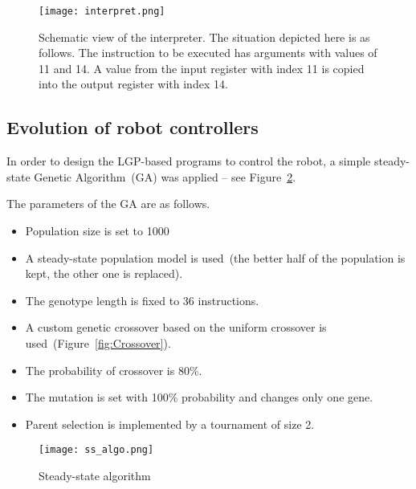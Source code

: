 \documentclass{ExcelAtFIT}
\begin{document}
\begin{figure}[h]
	\centering
	{\texttt{[image: interpret.png]}}
	\caption{
	Schematic view of the interpreter.
	The situation depicted here is as follows.
	The instruction to be executed has arguments with values of 11 and 14.
	A value from the input register with index 11 is copied into the output register with index 14.
	}
	\label{fig:Interpret}
\end{figure}



\subsection{Evolution of robot controllers}
\label{sec:EvolutionOfRobotControllers}
In order to design the LGP-based programs to control the robot, a simple steady-state Genetic Algorithm~(GA) was applied -- see Figure~\ref{fig:SteadyStateAlgorithm}.

The parameters of the GA are as follows.
\begin{itemize}
	\item Population size is set to 1000
	\item A steady-state population model is used~(the better half of the population is kept, the other one is replaced).
	\item The genotype length is fixed to 36 instructions.
	\item A custom genetic crossover based on the uniform crossover is used~(Figure~\ref{fig:Crossover}).
	\item The probability of crossover is 80\%.
	\item The mutation is set with 100\% probability and changes only one gene.
	\item Parent selection is implemented by a tournament of size 2.
\end{itemize}

\begin{figure}[h]
	\centering
	{\texttt{[image: ss\_algo.png]}}
	\caption{
	Steady-state algorithm
	}
	\label{fig:SteadyStateAlgorithm}
\end{figure}
\end{document}
